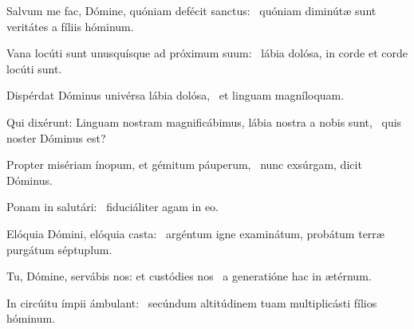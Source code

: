 \item Salvum me fac, Dómine, quóniam defécit sanctus:~\psstar{} quóniam diminútæ sunt veritátes a fíliis hóminum.

\item Vana locúti sunt unusquísque ad próximum suum:~\psstar{} lábia dolósa, in corde et corde locúti sunt.

\item Dispérdat Dóminus univérsa lábia dolósa,~\psstar{} et linguam magníloquam.

\item Qui dixérunt: Linguam nostram magnificábimus, lábia nostra a nobis sunt,~\psstar{} quis noster Dóminus est?

\item Propter misériam ínopum, et gémitum páuperum,~\psstar{} nunc exsúrgam, dicit Dóminus.

\item Ponam in salutári:~\psstar{} fiduciáliter agam in eo.

\item Elóquia Dómini, elóquia casta:~\psstar{} argéntum igne examinátum, probátum terræ purgátum séptuplum.

\item Tu, Dómine, servábis nos: et custódies nos~\psstar{} a generatióne hac in ætérnum.

\item In circúitu ímpii ámbulant:~\psstar{} secúndum altitúdinem tuam multiplicásti fílios hóminum.